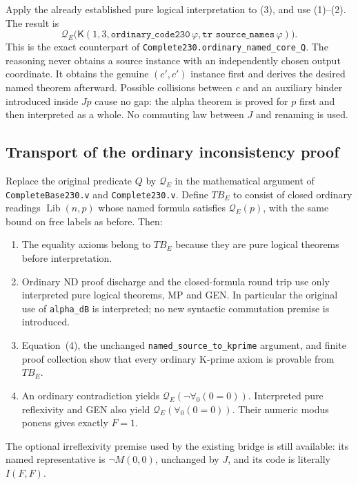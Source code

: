 Apply the already established pure logical interpretation to (3), and
use (1)--(2).  The result is
\[
 \boxed{\mathcal Q_E\bigl(
   \mathsf K(1,3,\texttt{ordinary\_code230}\,\varphi,
                 \texttt{tr source\_names}\,\varphi)\bigr).}
 \tag{4}
\]
This is the exact counterpart of
\texttt{Complete230.ordinary\_named\_core\_Q}.
The reasoning never obtains a source instance with an independently
chosen output coordinate.  It obtains the genuine $(c',c')$ instance
first and derives the desired named theorem afterward.
Possible collisions between $c$ and an auxiliary binder introduced
inside $Jp$ cause no gap: the alpha theorem is proved for $p$ first and
then interpreted as a whole.  No commuting law between $J$ and renaming
is used.

\subsection{Transport of the ordinary inconsistency proof}

Replace the original predicate $Q$ by $\mathcal Q_E$ in the mathematical
argument of \texttt{CompleteBase230.v} and \texttt{Complete230.v}.
Define $TB_E$ to consist of closed ordinary readings
$\operatorname{Lib}(n,p)$ whose named formula satisfies
$\mathcal Q_E(p)$, with the same bound on free labels as before.
Then:
\begin{enumerate}
\item The equality axioms belong to $TB_E$ because they are pure logical
      theorems before interpretation.
\item Ordinary ND proof discharge and the closed-formula round trip
      use only interpreted pure logical theorems, MP and GEN.
      In particular the original use of \texttt{alpha\_dB} is interpreted;
      no new syntactic commutation premise is introduced.
\item Equation~(4), the unchanged
      \texttt{named\_source\_to\_kprime} argument, and finite proof
      collection show that every ordinary K-prime axiom is provable from
      $TB_E$.
\item An ordinary contradiction yields
      $\mathcal Q_E(\neg\forall_0(0=0))$.
      Interpreted pure reflexivity and GEN also yield
      $\mathcal Q_E(\forall_0(0=0))$.  Their numeric modus ponens gives
      exactly $F=1$.
\end{enumerate}
The optional irreflexivity premise used by the existing bridge is still
available: its named representative is $\neg M(0,0)$, unchanged by $J$,
and its code is literally $I(F,F)$.

